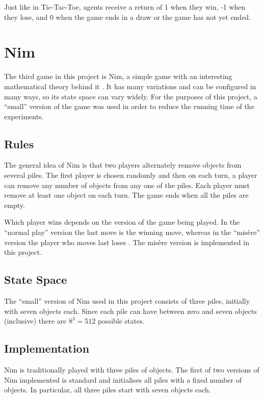 \documentclass[11pt,a4paper]{report}
\begin{document}
Just like in Tic-Tac-Toe, agents receive a return of 1 when they win, -1 when they lose, and 0 when the game ends in a draw or the game has not yet ended.


\section{Nim}
\label{sec:Nim}

The third game in this project is Nim, a simple game with an interesting mathematical theory behind it \cite{nim-rules}. It has many variations and can be configured in many ways, so its state space can vary widely. For the purposes of this project, a ``small'' version of the game was used in order to reduce the running time of the experiments.


\subsection{Rules}

The general idea of Nim \cite{nim-rules} is that two players alternately remove objects from several piles. The first player is chosen randomly and then on each turn, a player can remove any number of objects from any one of the piles. Each player must remove at least one object on each turn. The game ends when all the piles are empty.

Which player wins depends on the version of the game being played. In the ``normal play'' version the last move is the winning move, whereas in the ``mis\`ere'' version the player who moves last loses \cite{winning-ways-math-plays}. The mis\`ere version is implemented in this project.


\subsection{State Space}

The ``small'' version of Nim used in this project  consists of three piles, initially with seven objects each. Since each pile can have between zero and seven objects (inclusive) there are $8^3 = 512$ possible states.


\subsection{Implementation}
\label{sec:NimImplementation}

Nim is traditionally played with three piles of objects. The first of two versions of Nim implemented is standard and initialises all piles with a fixed number of objects. In particular, all three piles start with seven objects each.
\end{document}
